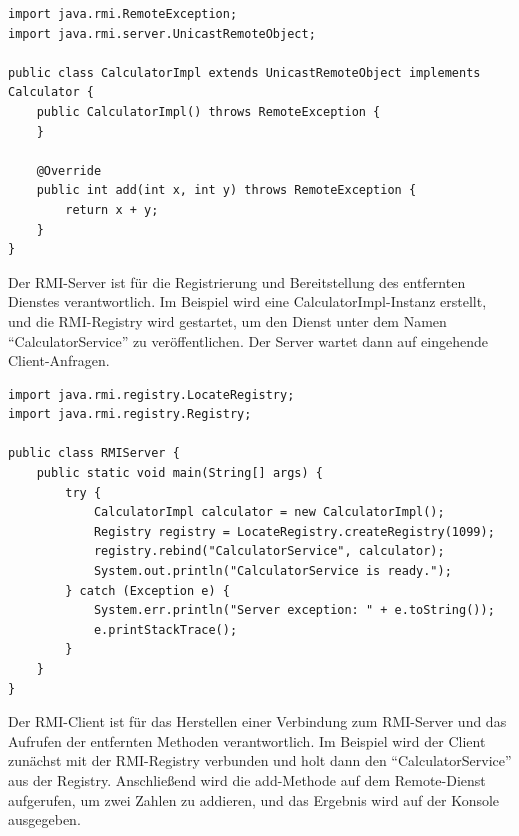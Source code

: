 \documentclass[../vs-script-first-v01.tex]{subfiles}
\begin{document}
\noindent\begin{minipage}{\textwidth}
\begin{lstlisting}[caption={Remote-Interface Implementierung (CalculatorImpl.java.java)},captionpos=b,label={lst:rmi-serverII}]
import java.rmi.RemoteException;
import java.rmi.server.UnicastRemoteObject;

public class CalculatorImpl extends UnicastRemoteObject implements Calculator {
    public CalculatorImpl() throws RemoteException {
    }

    @Override
    public int add(int x, int y) throws RemoteException {
        return x + y;
    }
}
\end{lstlisting}
\end{minipage}
Der RMI-Server ist für die Registrierung und Bereitstellung des entfernten Dienstes verantwortlich. Im Beispiel wird eine CalculatorImpl-Instanz erstellt, und die RMI-Registry wird gestartet, um den Dienst unter dem Namen \enquote{CalculatorService} zu veröffentlichen. Der Server wartet dann auf eingehende Client-Anfragen.

\noindent\begin{minipage}{\textwidth}
\begin{lstlisting}[caption={ RMI-Server (RMIServer.java)},captionpos=b,label={lst:rmi-serverIII}]
import java.rmi.registry.LocateRegistry;
import java.rmi.registry.Registry;

public class RMIServer {
    public static void main(String[] args) {
        try {
            CalculatorImpl calculator = new CalculatorImpl();
            Registry registry = LocateRegistry.createRegistry(1099);
            registry.rebind("CalculatorService", calculator);
            System.out.println("CalculatorService is ready.");
        } catch (Exception e) {
            System.err.println("Server exception: " + e.toString());
            e.printStackTrace();
        }
    }
}
\end{lstlisting}
\end{minipage}
Der RMI-Client ist für das Herstellen einer Verbindung zum RMI-Server und das Aufrufen der entfernten Methoden verantwortlich. Im Beispiel wird der Client zunächst mit der RMI-Registry verbunden und holt dann den \enquote{CalculatorService} aus der Registry. Anschließend wird die add-Methode auf dem Remote-Dienst aufgerufen, um zwei Zahlen zu addieren, und das Ergebnis wird auf der Konsole ausgegeben.\\\\
\end{document}
